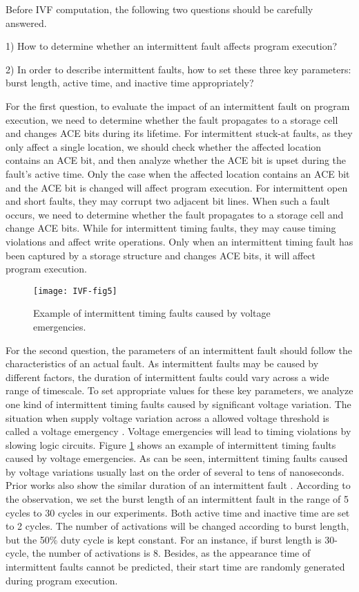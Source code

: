 Before IVF computation, the following two questions should be carefully answered.

1) How to determine whether an intermittent fault affects program execution?

2) In order to describe intermittent faults, how to set these three key parameters: burst length, active time, and inactive time appropriately?

For the first question, to evaluate the impact of an intermittent fault on program execution, we need to determine whether the fault propagates to a storage cell and changes ACE bits during its lifetime. For intermittent stuck-at faults, as they only affect a single location, we should check whether the affected location contains an ACE bit, and then analyze whether the ACE bit is upset during the fault’s active time. Only the case when the affected location contains an ACE bit and the ACE bit is changed will affect program execution. For intermittent open and short faults, they may corrupt two adjacent bit lines. When such a fault occurs, we need to determine whether the fault propagates to a storage cell and change ACE bits. While for intermittent timing faults, they may cause timing violations and affect write operations. Only when an intermittent timing fault has been captured by a storage structure and changes ACE bits, it will affect program execution.

\begin{figure}[t]
    \centering
    \texttt{[image: IVF-fig5]}\\
    \caption{Example of intermittent timing faults caused by voltage emergencies.}
    \label{fig:timing-faults}
\end{figure}

For the second question, the parameters of an intermittent fault should follow the characteristics of an actual fault. As intermittent faults may be caused by different factors, the duration of intermittent faults could vary across a wide range of timescale. To set appropriate values for these key parameters, we analyze one kind of intermittent timing faults caused by significant voltage variation. The situation when supply voltage variation across a allowed voltage threshold is called a voltage emergency \cite{joseph2003control}. Voltage emergencies will lead to timing violations by slowing logic circuits. Figure \ref{fig:timing-faults} shows an example of intermittent timing faults caused by voltage emergencies. As can be seen, intermittent timing faults caused by voltage variations usually last on the order of several to tens of nanoseconds. Prior works also show the similar duration of an intermittent fault \cite{smolens2007detecting} \cite{gracia2008analysis} \cite{stathis2001physical}. According to the observation, we set the burst length of an intermittent fault in the range of 5 cycles to 30 cycles in our experiments. Both active time and inactive time are set to 2 cycles. The number of activations will be changed according to burst length, but the 50\% duty cycle is kept constant. For an instance, if burst length is 30-cycle, the number of activations is 8. Besides, as the appearance time of intermittent faults cannot be predicted, their start time are randomly generated during program execution.

